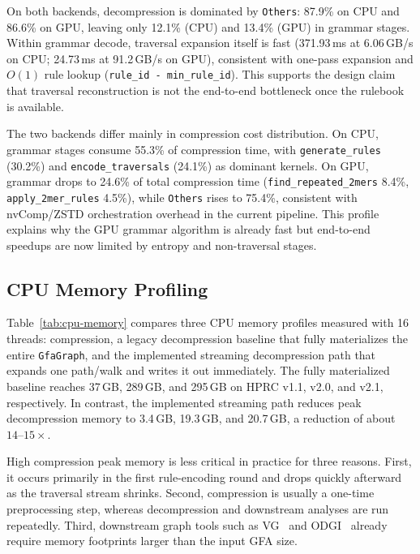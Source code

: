 On both backends, decompression is dominated by \texttt{Others}: 87.9\% on CPU and 86.6\% on GPU, leaving only 12.1\% (CPU) and 13.4\% (GPU) in grammar stages.
Within grammar decode, traversal expansion itself is fast (371.93\,ms at 6.06\,GB/s on CPU; 24.73\,ms at 91.2\,GB/s on GPU), consistent with one-pass expansion and \(O(1)\) rule lookup (\texttt{rule\_id - min\_rule\_id}).
This supports the design claim that traversal reconstruction is not the end-to-end bottleneck once the rulebook is available.

The two backends differ mainly in compression cost distribution.
On CPU, grammar stages consume 55.3\% of compression time, with \texttt{generate\_rules} (30.2\%) and \texttt{encode\_traversals} (24.1\%) as dominant kernels.
On GPU, grammar drops to 24.6\% of total compression time (\texttt{find\_repeated\_2mers} 8.4\%, \texttt{apply\_2mer\_rules} 4.5\%), while \texttt{Others} rises to 75.4\%, consistent with nvComp/ZSTD orchestration overhead in the current pipeline.
This profile explains why the GPU grammar algorithm is already fast but end-to-end speedups are now limited by entropy and non-traversal stages.

\subsection{CPU Memory Profiling}\label{subsec:cpu-memory}

Table~\ref{tab:cpu-memory} compares three CPU memory profiles measured with 16 threads: compression, a legacy decompression baseline that fully materializes the entire \texttt{GfaGraph}, and the implemented streaming decompression path that expands one path/walk and writes it out immediately. The fully materialized baseline reaches 37\,GB, 289\,GB, and 295\,GB on HPRC v1.1, v2.0, and v2.1, respectively. In contrast, the implemented streaming path reduces peak decompression memory to 3.4\,GB, 19.3\,GB, and 20.7\,GB, a reduction of about \(14\text{--}15\times\).

High compression peak memory is less critical in practice for three reasons. First, it occurs primarily in the first rule-encoding round and drops quickly afterward as the traversal stream shrinks. Second, compression is usually a one-time preprocessing step, whereas decompression and downstream analyses are run repeatedly. Third, downstream graph tools such as VG~\cite{garrison2018variation} and ODGI~\cite{guarracino2022odgi} already require memory footprints larger than the input GFA size.
